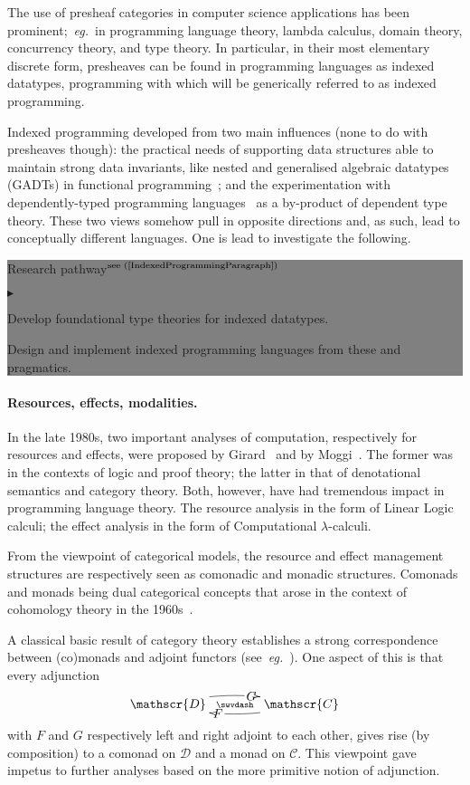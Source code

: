 \documentclass[11pt,twocolumn]{article}
\newenvironment{btritemize}
  {\begin{list}{\btr}
  {\setlength{\topsep}{2pt}
   \setlength{\partopsep}{2pt}
   \setlength{\itemsep}{2.5pt}
   \setlength{\parsep}{2.5pt}
   \setlength{\leftmargin}{1em}
   \setlength{\labelwidth}{.5em}}}
  {\end{list}}
\newcommand{\mytextsf}[1]{\textsf{\small #1}}
\newcommand{\eg}{\emph{eg.}}
\newcommand{\btr}{$\blacktriangleright$}
\newcommand{\reqpsize}{8.113395cm}%
\newcommand{\rep}[2]{\begin{center}\colorbox{grey}{\begin{minipage}{\reqpsize}
  \mytextsf{Research pathway}\hfill$^{\mbox{\scriptsize see #1 }}$\\[-5.5mm]
  \begin{btritemize}
  \item #2
  \end{btritemize}
\end{minipage}}\end{center}}
\newcommand{\cat}[1]{\mathscr{#1}}
\begin{document}
The use of presheaf categories in computer science applications has been
prominent;~\eg~in 
programming language theory, %
lambda calculus, %
domain theory, %
concurrency theory, %
and type theory. %
In particular, in their most elementary discrete form, presheaves can be
found in programming languages as indexed datatypes, programming with
which will be generically referred to as indexed programming.  

Indexed programming developed from two main influences (none to do with
presheaves though): the practical needs of supporting data structures able to
maintain strong data invariants, like nested %
and generalised algebraic %
datatypes (GADTs) in functional programming~\cite{Omega,Haskell}; and the
experimentation with dependently-typed programming
languages~\cite{Cayenne,Epigram} as a by-product of dependent type theory.
These two views somehow pull in opposite directions and, as such, lead to
conceptually different languages.  One is lead to investigate the following.
\rep{(\ref{IndexedProgrammingParagraph})} 
  {Develop foundational type theories for indexed datatypes.  
    
   Design and %
   implement indexed programming languages from these and
   pragmatics.}

\paragraph{Resources, effects, modalities.}
\label{ResourcesEffectsModalitiesParagraph}

In the late 1980s, two important analyses of computation, respectively for
resources and effects, were proposed by Girard~\cite{GirardLinearLogic} and by
Moggi~\cite{MoggiLambdaC}.  The former was in the contexts of logic and proof
theory; the latter in that of denotational semantics and category theory.
Both, however, have had tremendous impact in programming language theory.  The
resource analysis in the form of Linear Logic calculi; the effect analysis
in the form of Computational \mbox{$\lambda$-calculi}.

From the viewpoint of categorical models, the resource and effect management
structures are respectively seen as comonadic and monadic structures.
Comonads and monads being dual categorical concepts that arose in the context
of cohomology theory in the 1960s~\cite{BeckThesis}.

A classical basic result of category theory establishes a strong
correspondence between (co)monads and adjoint functors
(see~\eg~\cite{MacLane}).  One aspect of this is that every adjunction
  \begin{equation}\label{ResourceEffectAdjunction}
  \xymatrix@C=40pt{
    \cat D \ar@/^.75em/[r]|(.625){\mbox{$\,G\,$}}\ar@{}[r]|-\swvdash&
    \ar@/^.75em/[l]|(.625){\mbox{$\,F\,$}} \cat C }
\end{equation}
with $F$ and $G$ respectively left and right adjoint to each other, gives
rise (by composition) to a comonad on $\cat D$ and a monad on $\cat C$.  This
viewpoint gave impetus to further analyses based on the more primitive notion
of adjunction.  
\end{document}
